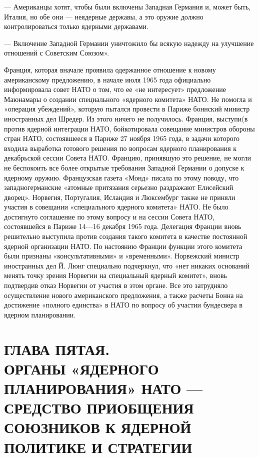 \documentclass[12pt, a4paper, openany]{book}
\begin{document}
		— Американцы хотят, чтобы были включены Западная Германия и, может быть, Италия, но обе они — неядерные державы, а это оружие должно контролироваться только ядерными державами.
		
		— Включение Западной Германии уничтожило бы всякую надежду на улучшение отношений с Советским Союзом».
		
		Франция, которая вначале проявила одержанное отношение к новому американскому предложению, в начале июля 1965 года официально информировала совет НАТО о том, что ее «не интересует» предложение Маюнамары о создании специального «ядерного комитета» НАТО. Не помогла и «операция убеждений», которую пытался провести в Париже боннский министр иностранных дел Шредер. Из этого ничего не получилось. Франция, выступи(в против ядерной интеграции НАТО, бойкотировала совещание министров обороны стран НАТО, состоявшееся в Париже 27 ноября 1965 года, в задачи которого входила выработка готового решения по вопросам ядерного планирования к декабрьской сессии Совета НАТО. Францию, принявшую это решение, не могли не беспокоить все более открытые требования Западной Германии о допуске к ядерному оружию. Французская газета «Монд» писала по этому поводу, что западногерманские «атомные притязания серьезно раздражают Елисейский дворец». Норвегия, Португалия, Исландия и Люксембург также не приняли участия в совещании «специального ядерного комитета» НАТО. Не было достигнуто соглашение по этому вопросу и на сессии Совета НАТО, состоявшейся в Париже 14—16 декабря 1965 года. Делегация Франции вновь решительно выступила против создания такого комитета в качестве постоянной ядерной организации НАТО. По настоянию Франции функции этого комитета были признаны «консультативными» и «временными». Норвежский министр иностранных дел Й. Люнг специально подчеркнул, что «нет никаких оснований менять точку зрения Норвегии на специальный ядерный комитет», вновь подтвердив отказ Норвегии от участия в этом органе. Все это затрудняло осуществление нового американского предложения, а также расчеты Бонна на достижение «полного единства» в НАТО по вопросу об участии бундесвера в ядерном планировании.
		
				\newpage
		\section[Глава пятая. ОРГАНЫ «ЯДЕРНОГО ПЛАНИРОВАНИЯ» НАТО — СРЕДСТВО ПРИОБЩЕНИЯ СОЮЗНИКОВ К ЯДЕРНОЙ ПОЛИТИКЕ И СТРАТЕГИИ]{\center ГЛАВА ПЯТАЯ.\\ \textbf{ОРГАНЫ «ЯДЕРНОГО ПЛАНИРОВАНИЯ» НАТО — СРЕДСТВО ПРИОБЩЕНИЯ СОЮЗНИКОВ К ЯДЕРНОЙ ПОЛИТИКЕ И СТРАТЕГИИ
		}}	
\end{document}

